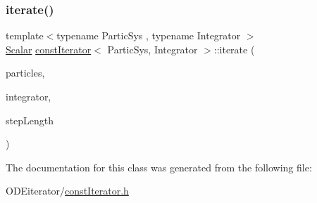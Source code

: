 \subsubsection{\texorpdfstring{iterate()}{iterate()}}
{\footnotesize\ttfamily template$<$typename Partic\+Sys , typename Integrator $>$ \\
\mbox{\hyperlink{classconst_iterator_a7cdf84749facbb55a6a2674646f92f52}{Scalar}} \mbox{\hyperlink{classconst_iterator}{const\+Iterator}}$<$ Partic\+Sys, Integrator $>$\+::iterate (\begin{DoxyParamCaption}\item[{Partic\+Sys \&}]{particles,  }\item[{Integrator \&}]{integrator,  }\item[{\mbox{\hyperlink{classconst_iterator_a7cdf84749facbb55a6a2674646f92f52}{Scalar}}}]{step\+Length }\end{DoxyParamCaption})\hspace{0.3cm}{\ttfamily [inline]}}



The documentation for this class was generated from the following file\+:\begin{DoxyCompactItemize}
\item 
O\+D\+Eiterator/\mbox{\hyperlink{const_iterator_8h}{const\+Iterator.\+h}}\end{DoxyCompactItemize}
